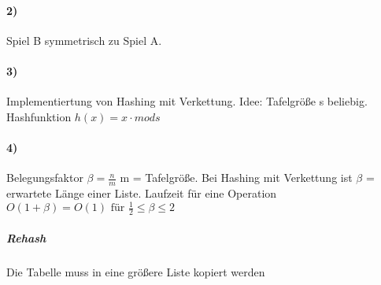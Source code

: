\begin{algorithm}
\end{algorithm}




\paragraph{2)}
Spiel B symmetrisch zu Spiel A.

\paragraph{3)} Implementiertung von Hashing mit Verkettung. Idee:
Tafelgröße s beliebig. Hashfunktion $ h(x) = x \cdot mod s $\\
\begin{algorithm}[H]
\end{algorithm}

\paragraph{4)} Belegungsfaktor $ \beta = \frac{n}{m} $ m = Tafelgröße. Bei Hashing mit Verkettung ist $ \beta $ = erwartete Länge einer Liste. Laufzeit für eine Operation $ O(1+\beta) = O(1) \text{ für } \frac{1}{2} \leq \beta \leq 2$ 
\subparagraph{Rehash} Die Tabelle muss in eine größere Liste kopiert werden \\
\begin{algorithm}[H]

\end{algorithm}

